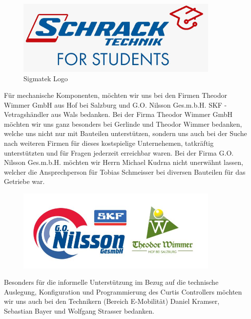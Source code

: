 \begin{figure}[H]
	\begin{center}
		\includegraphics[width=10cm]{figures/allgemein/Schrack_Logo.jpg}
		\caption{Sigmatek Logo}
	\end{center}
\end{figure}

Für mechanische Komponenten, möchten wir uns bei den Firmen Theodor Wimmer GmbH aus Hof bei Salzburg und G.O. Nilsson Ges.m.b.H. SKF - Vetragshändler aus Wals bedanken. Bei der Firma Theodor Wimmer GmbH möchten wir uns ganz besonders bei Gerlinde und Theodor Wimmer bedanken, welche uns nicht nur mit Bauteilen unterstützen, sondern uns auch bei der Suche nach weiteren Firmen für dieses kostspielige Unternehemen, tatkräftig unterstützten und für Fragen jederzeit erreichbar waren. Bei der Firma G.O. Nilsson Ges.m.b.H. möchten wir Herrn Michael Kudrna nicht unerwähnt lassen, welcher die Ansprechperson für Tobias Schmeisser bei diversen Bauteilen für das Getriebe war.

\begin{figure} [H]
	\begin{center}
		\includegraphics[width=10cm]{figures/mechanik/Sponsoren.jpg}		
	\end{center}
\end{figure}
	

\newpage


\vspace{0,5cm}
	
Besonders für die informelle Unterstützung im Bezug auf die technische Auslegung, Konfiguration und Programmierung des Curtis Controllers möchten wir uns auch bei den Technikern (Bereich E-Mobilität) Daniel Kramser, Sebastian Bayer und Wolfgang Strasser bedanken.



